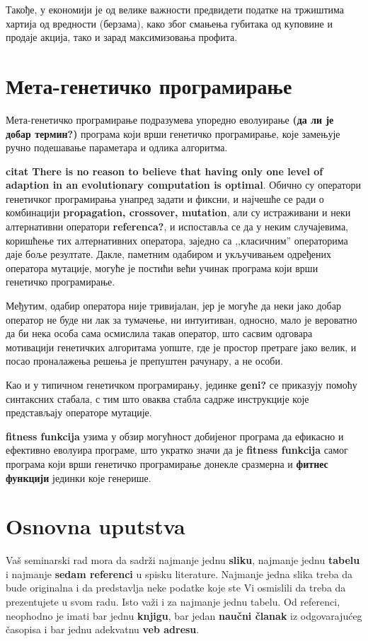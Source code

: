 \documentclass[a4paper]{article}
\begin{document}
Такође, у економији је од велике важности предвидети податке на тржиштима хартија од вредности (берзама), како због смањења губитака од куповине и продаје акција, тако и зарад максимизовања профита. \cite{stock}

\section{Мета-генетичко програмирање}

Мета-генетичко програмирање подразумева упоредно еволуирање \textbf{(да ли је добар термин?)} програма који врши генетичко програмирање, које замењује ручно подешавање параметара и одлика алгоритма. 
\linebreak

\textbf{citat There is no reason to believe that having only one level of adaption in an evolutionary computation is optimal}. Обично су оператори генетичког програмирања унапред задати и фиксни, и најчешће се ради о комбинацији \textbf{propagation, crossover, mutation}, али су истраживани и неки алтернативни оператори \textbf{referenca?}, и испоставља се да у неким случајевима, коришћење тих алтернативних оператора, заједно са ,,класичним'' операторима даје боље резултате. Дакле, паметним одабиром и укључивањем одређених оператора мутације, могуће је постићи већи учинак програма који врши генетичко програмирање.
\linebreak

Међутим, одабир оператора није тривијалан, јер је могуће да неки јако добар оператор не буде ни лак за тумачење, ни интуитиван, односно, мало је вероватно да би нека особа сама осмислила такав оператор, што сасвим одговара мотивацији генетичких алгоритама уопште, где је простор претраге јако велик, и посао проналажења решења је препуштен рачунару, а не особи.
\linebreak

Као и у типичном генетичком програмирању, јединке \textbf{geni?} се приказују помоћу синтаксних стабала, с тим што оваква стабла садрже инструкције које представљају операторе мутације.
\linebreak

\textbf{fitness funkcija} узима у обзир могућност добијеног програма да ефикасно и ефективно еволуира програме, што укратко значи да је \textbf{fitness funkcija} самог програма који врши генетичко програмирање донекле сразмерна и \textbf{фитнес функцији} јединки које генерише.

\section{Osnovna uputstva}
Vaš seminarski rad mora da sadrži najmanje jednu \textbf{sliku}, najmanje jednu \textbf{tabelu} i najmanje \textbf{sedam referenci} u spisku literature. Najmanje jedna slika treba da bude originalna i da predstavlja neke podatke koje ste Vi osmislili da treba da prezentujete u svom radu. Isto važi i za najmanje jednu tabelu. 	Od referenci, neophodno je imati bar jednu \textbf{knjigu}, bar jedan \textbf{naučni članak} iz odgovarajućeg časopisa i bar jednu adekvatnu \textbf{veb adresu}. 
\end{document}
